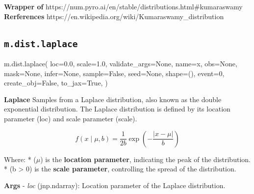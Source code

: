 \documentclass[
  letterpaper,
  DIV=11,
  numbers=noendperiod]{scrartcl}
\newenvironment{Shaded}{\begin{snugshade}}{\end{snugshade}}
\newcommand{\DecValTok}[1]{\textcolor[rgb]{0.68,0.00,0.00}{#1}}
\newcommand{\FloatTok}[1]{\textcolor[rgb]{0.68,0.00,0.00}{#1}}
\newcommand{\NormalTok}[1]{\textcolor[rgb]{0.00,0.23,0.31}{#1}}
\newcommand{\OperatorTok}[1]{\textcolor[rgb]{0.37,0.37,0.37}{#1}}
\newcommand{\StringTok}[1]{\textcolor[rgb]{0.13,0.47,0.30}{#1}}
\newcommand{\VariableTok}[1]{\textcolor[rgb]{0.07,0.07,0.07}{#1}}
\begin{document}
\textbf{Wrapper of}
https://num.pyro.ai/en/stable/distributions.html\#kumaraswamy
\textbf{Rerferences}
https://en.wikipedia.org/wiki/Kumaraswamy\_distribution

\subsection{\texorpdfstring{\texttt{m.dist.laplace}}{m.dist.laplace}}\label{laplace}

\begin{Shaded}
\begin{Highlighting}[]
\NormalTok{m.dist.laplace(}
\NormalTok{    loc}\OperatorTok{=}\FloatTok{0.0}\NormalTok{,}
\NormalTok{    scale}\OperatorTok{=}\FloatTok{1.0}\NormalTok{,}
\NormalTok{    validate\_args}\OperatorTok{=}\VariableTok{None}\NormalTok{,}
\NormalTok{    name}\OperatorTok{=}\StringTok{\textquotesingle{}x\textquotesingle{}}\NormalTok{,}
\NormalTok{    obs}\OperatorTok{=}\VariableTok{None}\NormalTok{,}
\NormalTok{    mask}\OperatorTok{=}\VariableTok{None}\NormalTok{,}
\NormalTok{    infer}\OperatorTok{=}\VariableTok{None}\NormalTok{,}
\NormalTok{    sample}\OperatorTok{=}\VariableTok{False}\NormalTok{,}
\NormalTok{    seed}\OperatorTok{=}\VariableTok{None}\NormalTok{,}
\NormalTok{    shape}\OperatorTok{=}\NormalTok{(),}
\NormalTok{    event}\OperatorTok{=}\DecValTok{0}\NormalTok{,}
\NormalTok{    create\_obj}\OperatorTok{=}\VariableTok{False}\NormalTok{,}
\NormalTok{    to\_jax}\OperatorTok{=}\VariableTok{True}\NormalTok{,}
\NormalTok{)}
\end{Highlighting}
\end{Shaded}

\textbf{Laplace} Samples from a Laplace distribution, also known as the
double exponential distribution. The Laplace distribution is defined by
its location parameter (loc) and scale parameter (scale).

\[
  f(x \mid \mu, b) = \frac{1}{2b} \exp\left( -\frac{|x - \mu|}{b} \right)
  \]

Where: * (\(\mu\)) is the \textbf{location parameter}, indicating the
peak of the distribution. * (b \textgreater{} 0) is the \textbf{scale
parameter}, controlling the spread of the distribution.

\textbf{Args} - \emph{loc} (jnp.ndarray): Location parameter of the
Laplace distribution.
\end{document}
